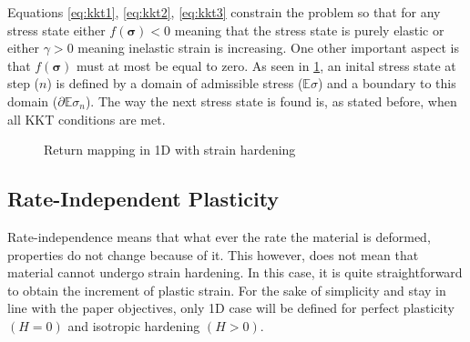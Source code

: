 \documentclass[final,5p,times,twocolumn]{elsarticle}
\begin{document}
Equations \ref{eq:kkt1}, \ref{eq:kkt2}, \ref{eq:kkt3} constrain the problem so that for any stress state either $f(\boldsymbol{\sigma}) < 0$ meaning that the stress state is purely elastic or either $\gamma > 0$ meaning inelastic strain is increasing. One other important aspect is that $f(\boldsymbol{\sigma})$ must at most be equal to zero. As seen in \cref{fig:returnmap}, an inital stress state at step ($n$) is defined by a domain of admissible stress ($\mathbb{E} \sigma$) and a boundary to this domain ($\partial \mathbb{E}\sigma_{n}$). The way the next stress state is found is, as stated before, when all KKT conditions are met.  

\begin{figure}
\centering
{}
\caption{Return mapping in 1D with strain hardening}
\label{fig:returnmap}
\end{figure}


\subsection{Rate-Independent Plasticity}
\label{sub:Rate-Independent Plasticity}
Rate-independence means that what ever the rate the material is deformed, properties do not change because of it. This however, does not mean that material cannot undergo strain hardening. In this case, it is quite straightforward to obtain the increment of plastic strain. For the sake of simplicity and stay in line with the paper objectives, only 1D case will be defined for perfect plasticity $(H=0)$ and isotropic hardening $(H>0)$.
\end{document}
